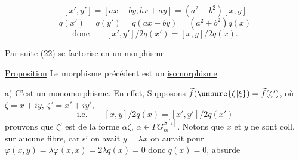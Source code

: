 \[
[x',y']=[ax-by,bx+ay]=(a^2+b^2)[x,y]
\]
\[
q(x')=q(y')=q(ax-by)=(a^2+b^2)q(x)
\]
\[
\text{donc}\qquad [x',y']/2q(x')=[x,y]/2q(x).
\]

Par suite (22) se factorise en un morphisme


\uline{Proposition}  Le morphisme précédent est un \uline{isomorphisme}.

a) C'est un monomorphisme. En effet, Supposons $\widetilde f(\unsure{\zeta|\xi})=\widetilde f(\zeta')$, où $\zeta=x+iy,\ \zeta'=x'+iy'$,
\[
\text{i.e.}\qquad [x,y]/2q(x)=[x',y']/2q(x')
\]
prouvons que $\zeta'$ est de la forme $\alpha\zeta$, $\alpha\in\Gamma G_m^{S[i]}$. Notons que $x$ et $y$ ne sont  coll. sur aucune fibre,  car si on avait $y=\lambda x$ on aurait pour $\varphi(x,y)=\lambda\varphi(x,x)=2\lambda q(x)=0$ donc $q(x)=0$, absurde
